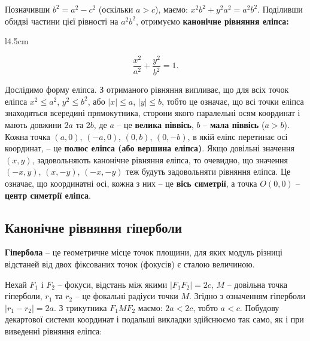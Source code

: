 Позначивши $b^2 = a^2 - c^2$ (оскільки $a>c$), маємо: $x^2b^2 + y^2a^2 = a^2b^2$.
Поділивши обидві частини цієї рівності на $a^2b^2$, отримуємо \textbf{канонічне рівняння
еліпса:}

\begin{wrapfigure}{l}{4.5cm}\end{wrapfigure}

$$\dfrac{x^2}{a^2} + \dfrac{y^2}{b^2} = 1.$$

Дослідимо форму еліпса. З отриманого рівняння
випливає, що для всіх точок еліпса
$x^2 \leqslant a^2$, $y^2 \leqslant b^2$, або $|x| \leqslant a$, $|y| \leqslant b$, тобто це
означає, що всі точки еліпса знаходяться всередині
прямокутника, сторони якого паралельні осям координат і мають довжини $2a$ та
$2b$, де $a$ -- це \textbf{велика піввісь}, $b$ -- \textbf{мала піввісь} ($a>b$). Кожна точка
$(a,0)$, $(-a,0)$, $(0,b)$, $(0,-b)$, в якій еліпс перетинає осі координат, -- це
\textbf{полюс еліпса (або вершина еліпса)}. Якщо довільні значення $(x,y)$, задовольняють
канонічне рівняння еліпса, то очевидно, що значення $(-x,y)$, $(x,-y)$, $(-x,-y)$ теж будуть
задовольняти рівняння еліпса. Це означає, що координатні осі, кожна з них -- це \textbf{вісь
симетрії}, а точка $O(0,0)$ -- \textbf{центр симетрії еліпса}. 

\subsection{Канонічне рівняння гіперболи}

\begin{definition}[Гіпербола]
	\textbf{Гіпербола} -- це геометричне місце точок площини, для яких
	модуль різниці відстаней від двох фіксованих точок (фокусів) є сталою величиною.
\end{definition}

Нехай $F_1$ і $F_2$ -- фокуси, відстань між якими $|F_1F_2| = 2c$, $M$ -- довільна точка
гіперболи, $r_1$ та $r_2$ -- це фокальні радіуси точки $M$.
Згідно з означенням гіперболи $|r_1 - r_2| = 2a$.
З трикутника $F_1MF_2$ маємо: $2a < 2c$, тобто $a < c$.
Побудову декартової системи координат і подальші
викладки здійснюємо так само, як і при виведенні рівняння еліпса:

